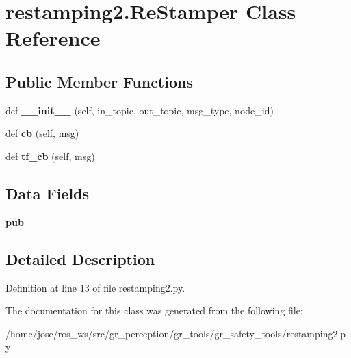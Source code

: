 \hypertarget{classrestamping2_1_1ReStamper}{}\section{restamping2.\+Re\+Stamper Class Reference}
\label{classrestamping2_1_1ReStamper}
\subsection*{Public Member Functions}
\begin{DoxyCompactItemize}
\item 
\mbox{\label{classrestamping2_1_1ReStamper_ac1bd1466dbb04af3e048296c31c26959}} 
def {\bfseries \+\_\+\+\_\+init\+\_\+\+\_\+} (self, in\+\_\+topic, out\+\_\+topic, msg\+\_\+type, node\+\_\+id)
\item 
\mbox{\label{classrestamping2_1_1ReStamper_adba9c438ef0cc28f6c25d222fa6ebb12}} 
def {\bfseries cb} (self, msg)
\item 
\mbox{\label{classrestamping2_1_1ReStamper_adc155cb1ded351381d2a702b9f7a6e19}} 
def {\bfseries tf\+\_\+cb} (self, msg)
\end{DoxyCompactItemize}
\subsection*{Data Fields}
\begin{DoxyCompactItemize}
\item 
\mbox{\label{classrestamping2_1_1ReStamper_a7e3b3bf96b269483a6058a6d9acc202e}} 
{\bfseries pub}
\end{DoxyCompactItemize}


\subsection{Detailed Description}


Definition at line 13 of file restamping2.\+py.



The documentation for this class was generated from the following file\+:\begin{DoxyCompactItemize}
\item 
/home/jose/ros\+\_\+ws/src/gr\+\_\+perception/gr\+\_\+tools/gr\+\_\+safety\+\_\+tools/restamping2.\+py\end{DoxyCompactItemize}
